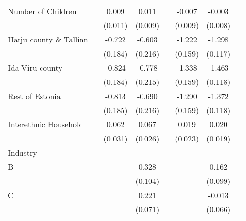 \begin{longtable}{l*{3}{c}|l*{3}{c}}
		Number of Children         &                     &       0.009         &       0.011         &                     &      -0.007         &      -0.003         \\
		&                     &     (0.011)         &     (0.009)         &                     &     (0.009)         &     (0.008)         \\
		Harju county \& Tallinn&                     &      -0.722\sym{***}&      -0.603\sym{**} &                     &      -1.222\sym{***}&      -1.298\sym{***}\\
		&                     &     (0.184)         &     (0.216)         &                     &     (0.159)         &     (0.117)         \\
		Ida-Viru county   &                     &      -0.824\sym{***}&      -0.778\sym{***}&                     &      -1.338\sym{***}&      -1.463\sym{***}\\
		&                     &     (0.184)         &     (0.215)         &                     &     (0.159)         &     (0.118)         \\
		Rest of Estonia   &                     &      -0.813\sym{***}&      -0.690\sym{**} &                     &      -1.290\sym{***}&      -1.372\sym{***}\\
		&                     &     (0.185)         &     (0.216)         &                     &     (0.159)         &     (0.118)         \\
		Interethnic Household&                     &       0.062\sym{*}  &       0.067\sym{*}  &                     &       0.019         &       0.020         \\
		&                     &     (0.031)         &     (0.026)         &                     &     (0.023)         &     (0.019)         \\
		Industry &&&&&\\
		B                   &                     &                     &       0.328\sym{**} &                     &                     &       0.162         \\
		&                     &                     &     (0.104)         &                     &                     &     (0.099)         \\
		C                   &                     &                     &       0.221\sym{**} &                     &                     &      -0.013         \\
		&                     &                     &     (0.071)         &                     &                     &     (0.066)         \\

\end{longtable}
